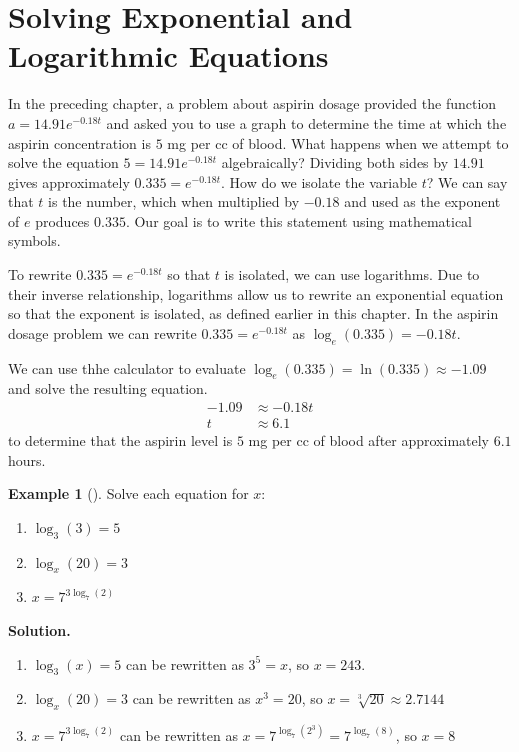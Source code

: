 \documentclass[10pt,]{book}
\theoremstyle{plain}
\theoremstyle{definition}
\theoremstyle{definition}
\newtheorem{example}[theorem]{Example}
\theoremstyle{definition}
\numberwithin{equation}{section}
\newcommand{\amp}{&}
\begin{document}
\section[{Solving Exponential and Logarithmic Equations}]{Solving Exponential and Logarithmic Equations}\label{chapter05-section04}
\hypertarget{p-367}{}%
In the preceding chapter, a problem about aspirin dosage provided the function \(a = 14.91e^{-0.18t}\) and asked you to use a graph to determine the time at which the aspirin concentration is \(5\) mg per cc of blood. What happens when we attempt to solve the equation \(5 = 14.91e^{-0.18t}\) algebraically? Dividing both sides by \(14.91\) gives approximately \(0.335 = e^{-0.18t}\). How do we isolate the variable \(t\)?  We can say that \(t\) is the number, which when multiplied by \(-0.18\) and used as the exponent of \(e\) produces \(0.335\).  Our goal is to write this statement using mathematical symbols.%
\par
\hypertarget{p-368}{}%
To rewrite \(0.335 = e^{-0.18t}\) so that \(t\) is isolated, we can use logarithms. Due to their inverse relationship, logarithms allow us to rewrite an exponential equation so that the exponent is isolated, as defined earlier in this chapter. In the aspirin dosage problem we can rewrite \(0.335 = e^{-0.18t}\) as \(\log_e \left( 0.335 \right) = -0.18t\).%
\par
\hypertarget{p-369}{}%
We can use thhe calculator to evaluate \(\log_e \left( 0.335 \right) = \ln \left( 0.335 \right) \approx -1.09\) and solve the resulting equation.%
\begin{align*}
-1.09 \amp \approx -0.18t\\
t \amp \approx 6.1
\end{align*}
to determine that the aspirin level is \(5\) mg per cc of blood after approximately \(6.1\) hours.%
\begin{example}[]\label{example-29}
\hypertarget{p-370}{}%
Solve each equation for \(x\): \leavevmode%
\begin{enumerate}
\item\hypertarget{li-280}{}\(\log_3 \left( 3 \right) = 5\)%
\item\hypertarget{li-281}{}\(\log_x \left( 20 \right) = 3\)%
\item\hypertarget{li-282}{}\(x = 7^{3\log_7 \left( 2 \right)}\)%
\end{enumerate}
%
\par\smallskip%
\noindent\textbf{Solution.}\hypertarget{solution-29}{}\quad%
\hypertarget{p-371}{}%
\leavevmode%
\begin{enumerate}
\item\hypertarget{li-283}{}\(\log_3 \left( x \right) = 5\) can be rewritten as \(3^5 = x\), so \(x = 243\).%
\item\hypertarget{li-284}{}\(\log_x \left( 20 \right) = 3\) can be rewritten as \(x^3 = 20\), so \(x = \sqrt[3]{20} \approx 2.7144\)%
\item\hypertarget{li-285}{}\(x = 7^{3\log_7 \left( 2 \right)}\) can be rewritten as \(x = 7 ^{\log_7 \left( 2^3 \right)} = 7 ^ {\log_7 \left( 8 \right)}\), so \(x = 8\)%
\end{enumerate}
%
\end{example}
\end{document}
